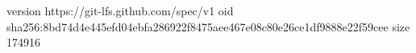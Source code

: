 version https://git-lfs.github.com/spec/v1
oid sha256:8bd74d4e445efd04ebfa286922f8475aee467e08c80e26ce1df9888e22f59cee
size 174916
